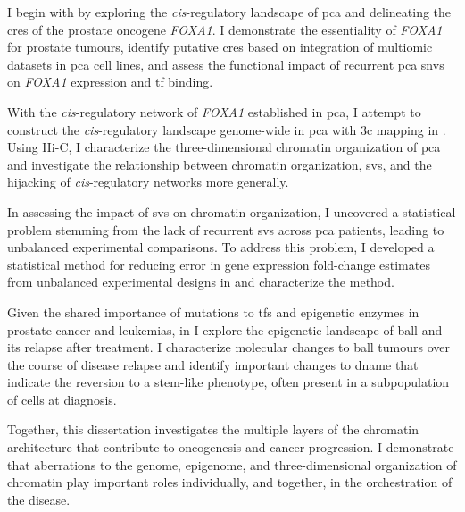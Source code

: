 I begin with  by exploring the \emph{cis}-regulatory landscape of \gls{pca} and delineating the \glspl{cre} of the prostate oncogene \emph{FOXA1}.
I demonstrate the essentiality of \emph{FOXA1} for prostate tumours, identify putative \glspl{cre} based on integration of multiomic datasets in \gls{pca} cell lines, and assess the functional impact of recurrent \gls{pca} \glspl{snv} on \emph{FOXA1} expression and \gls{tf} binding.

With the \emph{cis}-regulatory network of \emph{FOXA1} established in \gls{pca}, I attempt to construct the \emph{cis}-regulatory landscape genome-wide in \gls{pca} with \gls{3c} mapping in .
Using Hi-C, I characterize the three-dimensional chromatin organization of \gls{pca} and investigate the relationship between chromatin organization, \glspl{sv}, and the hijacking of \emph{cis}-regulatory networks more generally.

In assessing the impact of \glspl{sv} on chromatin organization, I uncovered a statistical problem stemming from the lack of recurrent \glspl{sv} across \gls{pca} patients, leading to unbalanced experimental comparisons.
To address this problem, I developed a statistical method for reducing error in gene expression fold-change estimates from unbalanced experimental designs in  and characterize the method.

Given the shared importance of mutations to \glspl{tf} and epigenetic enzymes in prostate cancer and leukemias, in  I explore the epigenetic landscape of \gls{ball} and its relapse after treatment.
I characterize molecular changes to \gls{ball} tumours over the course of disease relapse and identify important changes to \gls{dname} that indicate the reversion to a stem-like phenotype, often present in a subpopulation of cells at diagnosis.

Together, this dissertation investigates the multiple layers of the chromatin architecture that contribute to oncogenesis and cancer progression.
I demonstrate that aberrations to the genome, epigenome, and three-dimensional organization of chromatin play important roles individually, and together, in the orchestration of the disease.
